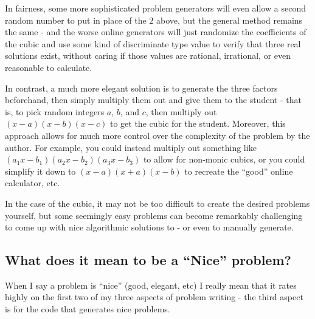 \documentclass{article}
\begin{document}
        In fairness, some more sophisticated problem generators will even allow a second random number to put in place of the $2$ above, but the general method remains the same - and the worse online generators will just randomize the coefficients of the cubic and use some kind of discriminate type value to verify that three real solutions exist, without caring if those values are rational, irrational, or even reasonable to calculate.
        
        In contrast, a much more elegant solution is to generate the three factors beforehand, then simply multiply them out and give them to the student - that is, to pick random integers $a$, $b$, and $c$, then multiply out $(x-a)(x-b)(x-c)$ to get the cubic for the student. Moreover, this approach allows for much more control over the complexity of the problem by the author. For example, you could instead multiply out something like $(a_1x-b_1)(a_2x-b_2)(a_3x-b_3)$ to allow for non-monic cubics, or you could simplify it down to $(x-a)(x+a)(x-b)$ to recreate the ``good'' online calculator, etc. 
        
        In the case of the cubic, it may not be too difficult to create the desired problems yourself, but some seemingly easy problems can become remarkably challenging to come up with nice algorithmic solutions to - or even to manually generate.
        
    \subsection{What does it mean to be a ``Nice'' problem?}
        When I say a problem is ``nice'' (good, elegant, etc) I really mean that it rates highly on the first two of my three aspects of problem writing - the third aspect is for the code that generates nice problems.
        
\end{document}
